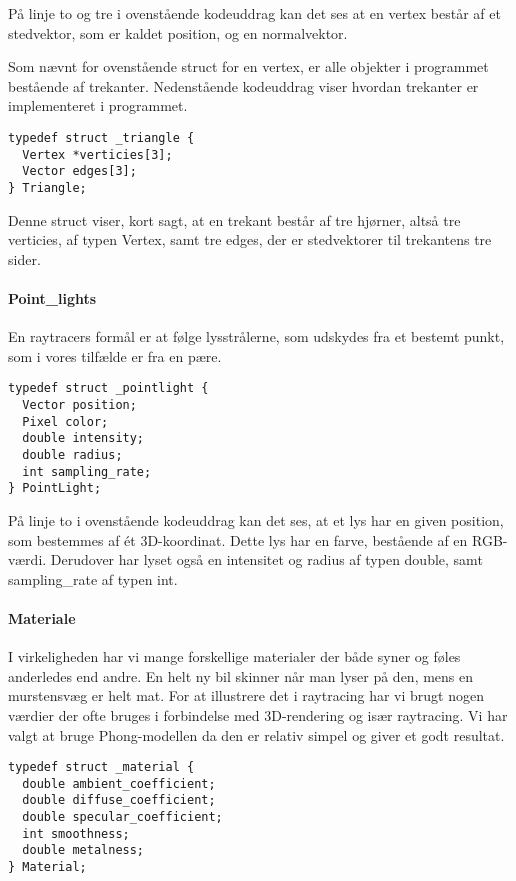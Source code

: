 På linje to og tre i ovenstående kodeuddrag kan det ses at en vertex består af et stedvektor, som er kaldet position, og en normalvektor.
    
Som nævnt for ovenstående struct for en vertex, er alle objekter i programmet bestående af trekanter. Nedenstående kodeuddrag viser hvordan trekanter er implementeret i programmet.
    
\begin{lstlisting}[style=Cstyle, caption=Struct til triangle]
typedef struct _triangle {
  Vertex *verticies[3];
  Vector edges[3];
} Triangle;
\end{lstlisting}

Denne struct viser, kort sagt, at en trekant består af tre hjørner, altså tre verticies, af typen Vertex, samt tre edges, der er stedvektorer til trekantens tre sider. 

\paragraph{Point\_lights}

En raytracers formål er at følge lysstrålerne, som udskydes fra et bestemt punkt, som i vores tilfælde er fra en pære. 

\begin{lstlisting}[style=Cstyle, caption=Struct til light]
typedef struct _pointlight {
  Vector position;
  Pixel color;
  double intensity;
  double radius;
  int sampling_rate;
} PointLight;
\end{lstlisting}

På linje to i ovenstående kodeuddrag kan det ses, at et lys har en given position, som bestemmes af ét 3D-koordinat. Dette lys har en farve, bestående af en RGB-værdi. Derudover har lyset også en intensitet og radius af typen double, samt sampling_rate af typen int.

\paragraph{Materiale}
I virkeligheden har vi mange forskellige materialer der både syner og føles anderledes end andre. En helt ny bil skinner når man lyser på den, mens en murstensvæg er helt mat. For at illustrere det i raytracing har vi brugt nogen værdier der ofte bruges i forbindelse med 3D-rendering og især raytracing. Vi har valgt at bruge Phong-modellen da den er relativ simpel og giver et godt resultat.

\begin{lstlisting}[style=Cstyle, caption=Struct til Material]
typedef struct _material {
  double ambient_coefficient;
  double diffuse_coefficient;
  double specular_coefficient;
  int smoothness;
  double metalness; 
} Material;
\end{lstlisting}

